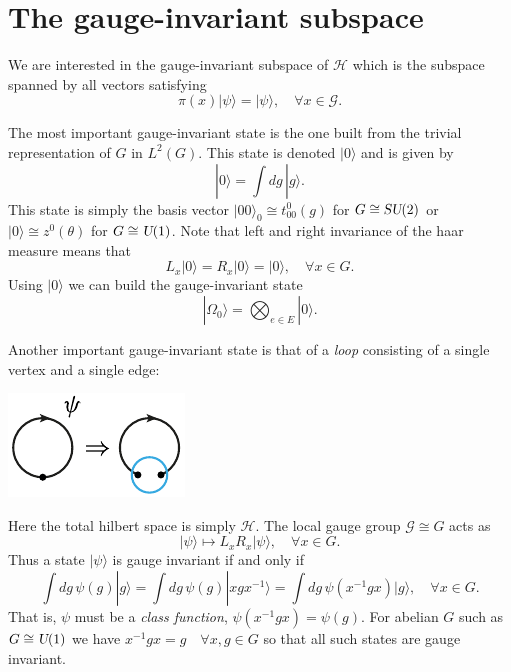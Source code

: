 \documentclass[12pt]{amsart}
\def\su2{\textsl{SU}(2)}
\def\uone{\textsl{U}(1)}
\theoremstyle{definition}
\theoremstyle{remark}
\numberwithin{equation}{section}
\begin{document}
\section{The gauge-invariant subspace}
We are interested in the gauge-invariant subspace of $\mathcal{H}$ which is the subspace spanned by all vectors satisfying
\begin{equation}
	\pi(x) |\psi\rangle = |\psi\rangle, \quad \forall x \in \mathcal{G}.
\end{equation}

The most important gauge-invariant state is the one built from the trivial representation of $G$ in $L^2(G)$. This state is denoted $|0\rangle$ and is given by
\begin{equation}
	|0\rangle = \int dg\, |g\rangle.
\end{equation}
This state is simply the basis vector $|00\rangle_0 \cong t^0_{00}(g)$ for $G \cong \su2$
or $|0\rangle \cong z^0(\theta)$ for $G \cong \uone$. 
Note that left and right invariance of the haar measure means that
\begin{equation}
	L_x|0\rangle = R_x|0\rangle = |0\rangle, \quad \forall x \in G.
\end{equation}
Using $|0\rangle$ we can build the gauge-invariant state 
\begin{equation}
	|\Omega_0\rangle = \bigotimes_{e\in E} |0\rangle.
\end{equation}

Another important gauge-invariant state is that of a \emph{loop} consisting of a single vertex and a single edge:
\begin{center}
	\includegraphics{singlevertex.pdf}
\end{center}
Here the total hilbert space is simply $\mathcal{H}$. The local gauge group $\mathcal{G} \cong G$ acts as
\begin{equation}
	|\psi\rangle \mapsto L_xR_x |\psi\rangle, \quad \forall x\in G.
\end{equation}
Thus a state $|\psi\rangle$ is gauge invariant if and only if
\begin{equation}\label{eq:classstate}
	\int dg\, \psi(g) |g\rangle= \int dg\, \psi(g) |xgx^{-1}\rangle = \int dg\, \psi(x^{-1}gx) |g\rangle, \quad\forall x\in G.
\end{equation}
That is, $\psi$ must be a \emph{class function}, $\psi(x^{-1}gx) = \psi(g)$. 
For abelian $G$ such as $G \cong \uone$ we have $x^{-1}gx = g \quad \forall x,g \in G$ so that all
such states are gauge invariant.
\end{document}
